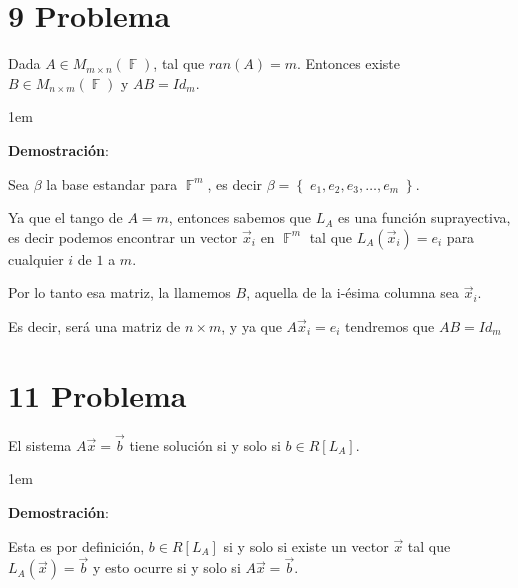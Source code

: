 \documentclass[12pt, fleqn]{article}                             %
\newenvironment{SmallIndentation}[1][0.75em]                    %
        {\begin{adjustwidth}{#1}{}\begin{footnotesize}}             %
        {\end{footnotesize}\end{adjustwidth}}                       %
\theoremstyle{break}                                            %
\DeclareMathOperator \GenericField {\mathbb{F}}                 %
\newcommand{\Set}[1]    {\left\{ \; #1 \; \right\}}             %
\begin{document}
\section{9 Problema}

    Dada $A \in M_{m \times n}(\GenericField)$, tal que $ran(A) = m$. Entonces existe 
    $B \in M_{n \times m}(\GenericField)$ y $AB = Id_m$.

    \begin{SmallIndentation}[1em]
        \textbf{Demostración}:
        

        Sea $\beta$ la base estandar para $\GenericField^m$, es decir
        $\beta = \Set{e_1, e_2, e_3, \dots, e_m}$.

        Ya que el tango de $A = m$, entonces sabemos que $L_A$ es una función suprayectiva,
        es decir podemos encontrar un vector $\vec x_i$ en $\GenericField^m$ tal que $L_A(\vec x_i) = e_i$
        para cualquier $i$ de $1$ a $m$.

        Por lo tanto esa matriz, la llamemos $B$, aquella de la i-ésima columna sea $\vec x_i$.

        Es decir, será una matriz de $n \times m$, y ya que $A \vec x_i = e_i$ tendremos que $AB = Id_m$
    
    \end{SmallIndentation}





\clearpage
\section{11 Problema}

    El sistema $A \vec x = \vec b$ tiene solución si y solo si $b \in R[L_A]$.

    \begin{SmallIndentation}[1em]
        \textbf{Demostración}:
        
        Esta es por definición, $b \in R[L_A]$ si y solo si existe un vector
        $\vec x$ tal que $L_A(\vec x) = \vec b$ y esto ocurre si y solo si
        $A \vec x = \vec b$.

    \end{SmallIndentation}
\end{document}
